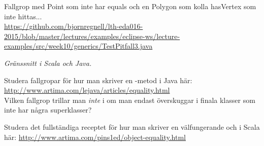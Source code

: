\Task \TODO 
Fallgrop med Point som inte har equals och en Polygon som kolla hasVertex som inte hittas...\\ \url{https://github.com/bjornregnell/lth-eda016-2015/blob/master/lectures/examples/eclipse-ws/lecture-examples/src/week10/generics/TestPitfall3.java}


\AdvancedTasks %

 
\Task \TODO \emph{Gränssnitt i Scala och Java.} 

\Task\Pen Studera fallgropar för hur man skriver en -metod i Java här:
\url{http://www.artima.com/lejava/articles/equality.html}\\
Vilken fallgrop trillar man \emph{inte} i om man endast överskuggar  i finala klasser som inte har några superklasser?

\Task\Pen Studera det fullständiga receptet för hur man skriver en välfungerande  och  i Scala här: \url{http://www.artima.com/pins1ed/object-equality.html} 


    